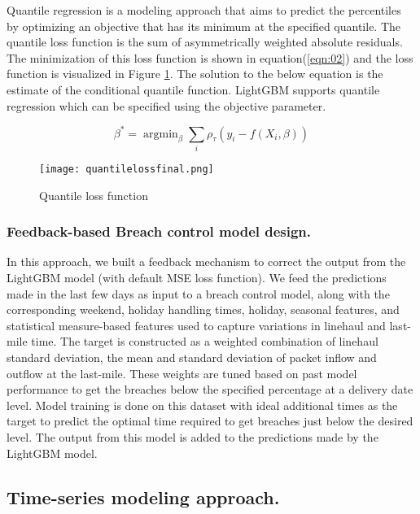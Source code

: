 \documentclass[twoside,leqno,twocolumn]{article}
\DeclareMathOperator*{\argmin}{argmin}
\begin{document}
Quantile regression\cite{koenker2001quantile} is a modeling approach that aims to predict the percentiles by optimizing an objective that has its minimum at the specified quantile. The quantile loss function is the sum of asymmetrically weighted absolute residuals. The minimization of this loss function is shown in equation(\ref{eqn:02}) and the loss function is visualized in Figure \ref{fig:quantilelossfinal}. The solution to the below equation is the estimate of the conditional quantile function. LightGBM supports quantile regression which can be specified using the objective parameter.

\begin{equation}\label{eqn:02}
\beta^{*} = \argmin_{\beta} \sum_i \rho _{\tau }(y_{i}-f ({X_{i}},\beta ))
\end{equation}

\begin{figure}[h]
\centering
    \texttt{[image: quantilelossfinal.png]}
\caption{Quantile loss function\cite{koenker2001quantile}}
    \label{fig:quantilelossfinal}
    \vspace{-2mm}
\end{figure}

\subsubsection{Feedback-based Breach control model design.}
In this approach, we built a feedback mechanism to correct the output from the LightGBM model (with default MSE loss function). We feed the predictions made in the last few days as input to a breach control model, along with the corresponding weekend, holiday handling times, holiday, seasonal features, and statistical measure-based features used to capture variations in linehaul and last-mile time. The target is constructed as a weighted combination of linehaul standard deviation, the mean and standard deviation of packet inflow and outflow at the last-mile. These weights are tuned based on past model performance to get the breaches below the specified percentage at a delivery date level. Model training is done on this dataset with ideal additional times as the target to predict the optimal time required to get breaches just below the desired level.\newline
The output from this model is added to the predictions made by the LightGBM model.

\subsection{Time-series modeling approach.}
\end{document}
